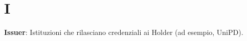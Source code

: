 \section{I}
\textbf{Issuer}: Istituzioni che rilasciano credenziali ai Holder (ad esempio, UniPD).\\
